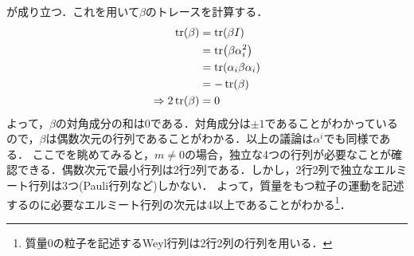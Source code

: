 \documentclass{report}
\begin{document}
    が成り立つ．これを用いて$\beta$のトレースを計算する．
    \begin{align}
      \tr(\beta) &= \tr(\beta I)\\
      &= \tr(\beta \alpha_i^2)\\
      &= \tr(\alpha_i\beta\alpha_i) \\
      &= -\tr(\beta)\\
      \Rightarrow 2\tr(\beta) &= 0
    \end{align}
    よって，$\beta$の対角成分の和は0である．対角成分は$\pm1$であることがわかっているので，$\beta$は偶数次元の行列であることがわかる．以上の議論は$\alpha^i$でも同様である．
    ここでを眺めてみると，$m\neq0$の場合，独立な4つの行列が必要なことが確認できる．偶数次元で最小行列は2行2列である．しかし，2行2列で独立なエルミート行列は3つ(Pauli行列など)しかない．
    よって，質量をもつ粒子の運動を記述するのに必要なエルミート行列の次元は4以上であることがわかる\footnote{質量0の粒子を記述するWeyl行列は2行2列の行列を用いる．}．
\end{document}
